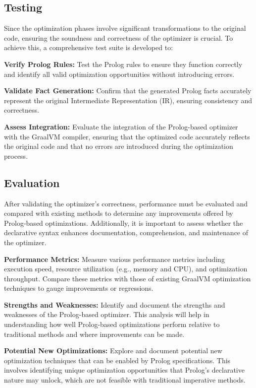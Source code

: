 \subsection{Testing}
Since the optimization phases involve significant transformations to the original code, ensuring the soundness and correctness of the optimizer is crucial. To achieve this, a comprehensive test suite is developed to:
\begin{compactitem}
    \item \textbf{Verify Prolog Rules:} Test the Prolog rules to ensure they function correctly and identify all valid optimization opportunities without introducing errors.
    \item \textbf{Validate Fact Generation:} Confirm that the generated Prolog facts accurately represent the original Intermediate Representation (IR), ensuring consistency and correctness.
    \item \textbf{Assess Integration:} Evaluate the integration of the Prolog-based optimizer with the GraalVM compiler, ensuring that the optimized code accurately reflects the original code and that no errors are introduced during the optimization process.
\end{compactitem}

\subsection{Evaluation}
After validating the optimizer's correctness, performance must be evaluated and compared with existing methods to determine any improvements offered by Prolog-based optimizations. Additionally, it is important to assess whether the declarative syntax enhances documentation, comprehension, and maintenance of the optimizer.
\begin{compactitem}
    \item \textbf{Performance Metrics:} Measure various performance metrics including execution speed, resource utilization (e.g., memory and CPU), and optimization throughput. Compare these metrics with those of existing GraalVM optimization techniques to gauge improvements or regressions.
    \item \textbf{Strengths and Weaknesses:} Identify and document the strengths and weaknesses of the Prolog-based optimizer. This analysis will help in understanding how well Prolog-based optimizations perform relative to traditional methods and where improvements can be made.
    \item \textbf{Potential New Optimizations:} Explore and document potential new optimization techniques that can be enabled by Prolog specifications. This involves identifying unique optimization opportunities that Prolog's declarative nature may unlock, which are not feasible with traditional imperative methods. 
\end{compactitem}

